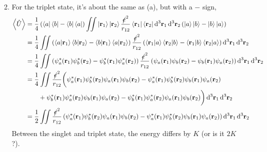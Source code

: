 \documentclass{homework}
\begin{document}
\begin{enumerate}
\begin{enumerate}
\begin{align*}
\end{align*}
			\item For the triplet state, it's about the same as (a), but with a $-$ sign, \begin{align*}
				\expval{\hat{U}} & = \frac{1}{4} 
					\left(\bra{a}\bra{b}-\bra{b}\bra{a}\right)
					\iint \ket{\boldsymbol{\mathrm{r}}_1}\ket{\boldsymbol{\mathrm{r}}_2}\frac{\slashed{e}^2}{r_{12}}
						\bra{\boldsymbol{\mathrm{r}}_1} \bra{\boldsymbol{\mathrm{r}}_2} \dd[3]{ \boldsymbol{\mathrm{r}} _1} \dd[3]{ \boldsymbol{\mathrm{r}} _2}
					\left(\ket{a}\ket{b}-\ket{b}\ket{a}\right) \\
						& = \frac{1}{4} \iint \left(
							\braket{a}{\boldsymbol{\mathrm{r}}_1}
							\braket{b}{\boldsymbol{\mathrm{r}}_2}
							-
							\braket{b}{\boldsymbol{\mathrm{r}}_1}
							\braket{a}{\boldsymbol{\mathrm{r}}_2}							
						\right)
						\frac{\slashed{e}^2}{r_{12}}
						\left(
							\braket{\boldsymbol{\mathrm{r}}_1}{a}
							\braket{\boldsymbol{\mathrm{r}}_2}{b}
							-
							\braket{\boldsymbol{\mathrm{r}}_1}{b}
							\braket{\boldsymbol{\mathrm{r}}_2}{a}							
						\right)
						\dd[3]{ \boldsymbol{\mathrm{r}} _1} \dd[3]{ \boldsymbol{\mathrm{r}} _2} \\
						& = \frac{1}{4} 
							\iint
						\left(
							\psi_a^*(\boldsymbol{\mathrm{r}}_1)
							\psi_b^*(\boldsymbol{\mathrm{r}}_2)
							-
							\psi_b^*(\boldsymbol{\mathrm{r}}_1)
							\psi_a^*(\boldsymbol{\mathrm{r}}_2)							
						\right)
						\frac{\slashed{e}^2}{r_{12}}
						\left(
							\psi_a(\boldsymbol{\mathrm{r}}_1)
							\psi_b(\boldsymbol{\mathrm{r}}_2)
							-
							\psi_b(\boldsymbol{\mathrm{r}}_1)
							\psi_a(\boldsymbol{\mathrm{r}}_2)							
						\right)
						\dd[3]{ \boldsymbol{\mathrm{r}} _1} \dd[3]{ \boldsymbol{\mathrm{r}} _2} \\
				& = \frac{1}{4} \iint \frac{\slashed{e}^2}{r_{12}} \bigg(
					\psi_a^*(\boldsymbol{\mathrm{r}}_1)
					\psi_b^*(\boldsymbol{\mathrm{r}}_2)
					\psi_a(\boldsymbol{\mathrm{r}}_1)
					\psi_b(\boldsymbol{\mathrm{r}}_2)
					-
					\psi_a^*(\boldsymbol{\mathrm{r}}_1)
					\psi_b^*(\boldsymbol{\mathrm{r}}_2)
					\psi_b(\boldsymbol{\mathrm{r}}_1)
					\psi_a(\boldsymbol{\mathrm{r}}_2)							
					\\
					& \qquad +
					\psi_b^*(\boldsymbol{\mathrm{r}}_1)
					\psi_a^*(\boldsymbol{\mathrm{r}}_2)
					\psi_b(\boldsymbol{\mathrm{r}}_1)
					\psi_a(\boldsymbol{\mathrm{r}}_2)	
					-						
					\psi_b^*(\boldsymbol{\mathrm{r}}_1)
					\psi_a^*(\boldsymbol{\mathrm{r}}_2)
					\psi_a(\boldsymbol{\mathrm{r}}_1)
					\psi_b(\boldsymbol{\mathrm{r}}_2) \bigg) \dd[3]{ \boldsymbol{\mathrm{r}} _1} \dd[3]{ \boldsymbol{\mathrm{r}} _2} \\
				& = \frac{1}{2} \iint \frac{\slashed{e}^2}{r_{12}} \left(
					\psi_a^*(\boldsymbol{\mathrm{r}}_1)
					\psi_b^*(\boldsymbol{\mathrm{r}}_2)
					\psi_a(\boldsymbol{\mathrm{r}}_1)
					\psi_b(\boldsymbol{\mathrm{r}}_2)
					-
					\psi_a^*(\boldsymbol{\mathrm{r}}_1)
					\psi_b^*(\boldsymbol{\mathrm{r}}_2)
					\psi_b(\boldsymbol{\mathrm{r}}_1)
					\psi_a(\boldsymbol{\mathrm{r}}_2)		
				\right) \dd[3]{ \boldsymbol{\mathrm{r}} _1} \dd[3]{ \boldsymbol{\mathrm{r}} _2} 
			\end{align*}
			Between the singlet and triplet state, the energy differs by $K$ (or is it $2K$?).
		\end{enumerate}
		

\end{enumerate}
\end{document}
